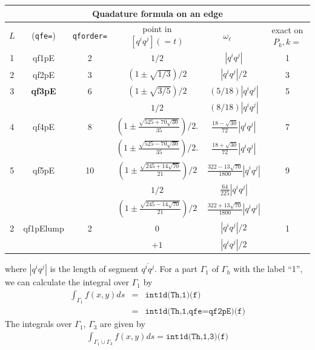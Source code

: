 \documentclass[a4paper,twoside,12pt]{book}
\begin{document}
\begin{center}
\begin{tabular}{|c|c|c|c|c|c|}
    \hline
    \multicolumn{6}{|c|}{ Quadature formula on an edge}\\
    \hline
    $L$ & (\texttt{qfe=}) & \texttt{qforder=} &
    point in $[q^iq^j](=t)$ & $\omega_\ell$~~~  & exact on $P_k, k=$ \\
    \hline
    \hline
    1 & qf1pE&2&$1/2$ & $|q^iq^j|$ & 1 \\
    \hline
    2 & qf2pE&3& $(1\pm\sqrt{1/3})/2$ & $|q^iq^j|/2$ & 3 \\
   \hline
    3 & \textbf{qf3pE} &6&$(1\pm\sqrt{3/5})/2$ & $(5/18)|q^iq^j|$ & 5  \\
    & & & $1/2$ & $(8/18)|q^iq^j|$ & \\
    \hline
    4 &{qf4pE} &8&$ (1 \pm  \frac{\sqrt{ 525  + 70 \sqrt{30}}}{35})/2
  .    $ & $  \frac{18-\sqrt{30}}{72} |q^iq^j|$ & 7  \\
     & & &$ (1 \pm  \frac{\sqrt{ 525  - 70 \sqrt{30}}}{35})/2
  .    $ & $  \frac{18+\sqrt{30}}{72} |q^iq^j|$ &   \\
    \hline
    5 &{qf5pE} &10&$ (1 \pm  \frac{\sqrt{245+14\sqrt{70}}}{21})/2$  & $ \frac{322-13\sqrt{70}}{1800} |q^iq^j|$ & 9  \\
    & & & $1/2$ & $\frac{64}{225}|q^iq^j|$ & \\
    & & & $ (1 \pm  \frac{\sqrt{245-14\sqrt{70}}}{21})/2$ & $ \frac{322+13\sqrt{70}}{1800} |q^iq^j|$ &\\
    \hline
    2 &qf1pElump&2& $0$ & $|q^iq^j|/2$ & 1 \\
    & &&$+1$ & $|q^iq^j|/2$ &  \\
    \hline

\end{tabular}
%
%
%
\end{center}

where $|q^iq^j|$ is the length of segment $\overline{q^iq^j}$.
For a part $\Gamma_1$ of $\Gamma_h$ with the label ``1'', we can
calculate the integral over $\Gamma_1$ by
\begin{eqnarray*}
\int_{\Gamma_1}f(x,y)ds&=&\texttt{int1d(Th,1)(f)}\\
&=&\texttt{int1d(Th,1,qfe=qf2pE)(f)}
\end{eqnarray*}
The integrals over $\Gamma_1,\, \Gamma_3$ are given by
\begin{eqnarray*}
\int_{\Gamma_1\cup \Gamma_3}f(x,y)ds=\texttt{int1d(Th,1,3)(f)}
\end{eqnarray*}
\end{document}

